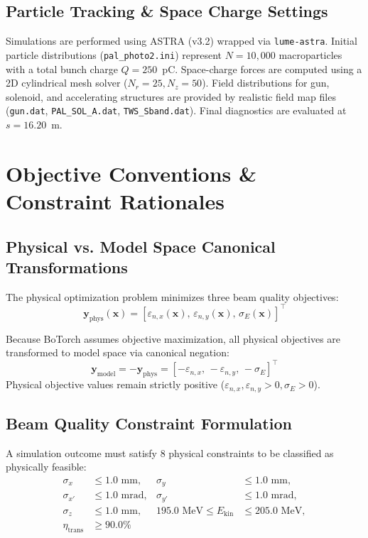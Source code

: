 \documentclass[11pt,a4paper]{article}
\begin{document}
\subsection{Particle Tracking \& Space Charge Settings}
Simulations are performed using ASTRA (v3.2) \cite{AstraManual} wrapped via \texttt{lume-astra}. Initial particle distributions (\texttt{pal\_photo2.ini}) represent $N = 10,000$ macroparticles with a total bunch charge $Q = 250$~pC. Space-charge forces are computed using a 2D cylindrical mesh solver ($N_r = 25, N_z = 50$). Field distributions for gun, solenoid, and accelerating structures are provided by realistic field map files (\texttt{gun.dat}, \texttt{PAL\_SOL\_A.dat}, \texttt{TWS\_Sband.dat}). Final diagnostics are evaluated at $s = 16.20$~m.

\section{Objective Conventions \& Constraint Rationales}
\label{sec:objectives_constraints}

\subsection{Physical vs. Model Space Canonical Transformations}
The physical optimization problem minimizes three beam quality objectives:
\begin{equation}
    \mathbf{y}_{\text{phys}}(\mathbf{x}) = \left[ \varepsilon_{n,x}(\mathbf{x}),\, \varepsilon_{n,y}(\mathbf{x}),\, \sigma_E(\mathbf{x}) \right]^\top
\end{equation}

Because BoTorch \cite{Botorch2020} assumes objective maximization, all physical objectives are transformed to model space via canonical negation:
\begin{equation}
    \mathbf{y}_{\text{model}} = -\mathbf{y}_{\text{phys}} = \left[ -\varepsilon_{n,x},\, -\varepsilon_{n,y},\, -\sigma_E \right]^\top
\end{equation}
Physical objective values remain strictly positive ($\varepsilon_{n,x}, \varepsilon_{n,y} > 0, \sigma_E > 0$).

\subsection{Beam Quality Constraint Formulation}
A simulation outcome must satisfy 8 physical constraints to be classified as physically feasible:
\begin{align}
    \sigma_x &\le 1.0\text{ mm}, & \sigma_y &\le 1.0\text{ mm}, \\
    \sigma_{x'} &\le 1.0\text{ mrad}, & \sigma_{y'} &\le 1.0\text{ mrad}, \\
    \sigma_z &\le 1.0\text{ mm}, & 195.0\text{ MeV} \le E_{\text{kin}} &\le 205.0\text{ MeV}, \\
    \eta_{\text{trans}} &\ge 90.0\%
\end{align}
\end{document}

